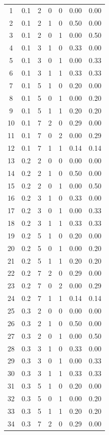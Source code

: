 \begin{longtable}{ccccccc}
1  & 0.1 & 2 & 0 & 0 & 0.00 & 0.00 \\
2  & 0.1 & 2 & 1 & 0 & 0.50 & 0.00 \\
3  & 0.1 & 2 & 0 & 1 & 0.00 & 0.50 \\
4  & 0.1 & 3 & 1 & 0 & 0.33 & 0.00 \\
5  & 0.1 & 3 & 0 & 1 & 0.00 & 0.33 \\
6  & 0.1 & 3 & 1 & 1 & 0.33 & 0.33 \\
7  & 0.1 & 5 & 1 & 0 & 0.20 & 0.00 \\
8  & 0.1 & 5 & 0 & 1 & 0.00 & 0.20 \\
9  & 0.1 & 5 & 1 & 1 & 0.20 & 0.20 \\
10 & 0.1 & 7 & 2 & 0 & 0.29 & 0.00 \\
11 & 0.1 & 7 & 0 & 2 & 0.00 & 0.29 \\
12 & 0.1 & 7 & 1 & 1 & 0.14 & 0.14 \\
13 & 0.2 & 2 & 0 & 0 & 0.00 & 0.00 \\
14 & 0.2 & 2 & 1 & 0 & 0.50 & 0.00 \\
15 & 0.2 & 2 & 0 & 1 & 0.00 & 0.50 \\
16 & 0.2 & 3 & 1 & 0 & 0.33 & 0.00 \\
17 & 0.2 & 3 & 0 & 1 & 0.00 & 0.33 \\
18 & 0.2 & 3 & 1 & 1 & 0.33 & 0.33 \\
19 & 0.2 & 5 & 1 & 0 & 0.20 & 0.00 \\
20 & 0.2 & 5 & 0 & 1 & 0.00 & 0.20 \\
21 & 0.2 & 5 & 1 & 1 & 0.20 & 0.20 \\
22 & 0.2 & 7 & 2 & 0 & 0.29 & 0.00 \\
23 & 0.2 & 7 & 0 & 2 & 0.00 & 0.29 \\
24 & 0.2 & 7 & 1 & 1 & 0.14 & 0.14 \\
25 & 0.3 & 2 & 0 & 0 & 0.00 & 0.00 \\
26 & 0.3 & 2 & 1 & 0 & 0.50 & 0.00 \\
27 & 0.3 & 2 & 0 & 1 & 0.00 & 0.50 \\
28 & 0.3 & 3 & 1 & 0 & 0.33 & 0.00 \\
29 & 0.3 & 3 & 0 & 1 & 0.00 & 0.33 \\
30 & 0.3 & 3 & 1 & 1 & 0.33 & 0.33 \\
31 & 0.3 & 5 & 1 & 0 & 0.20 & 0.00 \\
32 & 0.3 & 5 & 0 & 1 & 0.00 & 0.20 \\
33 & 0.3 & 5 & 1 & 1 & 0.20 & 0.20 \\
34 & 0.3 & 7 & 2 & 0 & 0.29 & 0.00 \\

\end{longtable}
